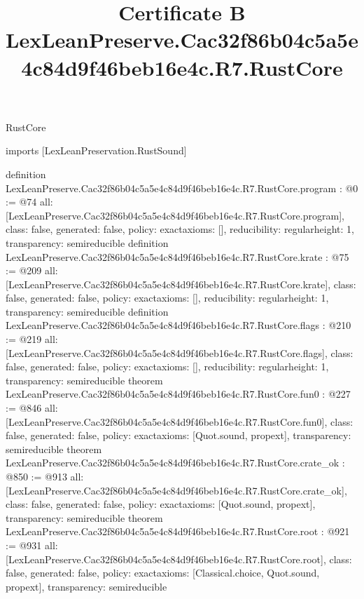 \begin{lexlean}{RustCore}
\title{Certificate B LexLeanPreserve.Cac32f86b04c5a5e4c84d9f46beb16e4c.R7.RustCore}
\begin{coremodule}
imports [LexLeanPreservation.RustSound]

definition LexLeanPreserve.Cac32f86b04c5a5e4c84d9f46beb16e4c.R7.RustCore.program : @0 := @74 {
  all: [LexLeanPreserve.Cac32f86b04c5a5e4c84d9f46beb16e4c.R7.RustCore.program],
  class: false,
  generated: false,
  policy: exact{axioms: []},
  reducibility: regular{height: 1},
  transparency: semireducible
}
definition LexLeanPreserve.Cac32f86b04c5a5e4c84d9f46beb16e4c.R7.RustCore.krate : @75 := @209 {
  all: [LexLeanPreserve.Cac32f86b04c5a5e4c84d9f46beb16e4c.R7.RustCore.krate],
  class: false,
  generated: false,
  policy: exact{axioms: []},
  reducibility: regular{height: 1},
  transparency: semireducible
}
definition LexLeanPreserve.Cac32f86b04c5a5e4c84d9f46beb16e4c.R7.RustCore.flags : @210 := @219 {
  all: [LexLeanPreserve.Cac32f86b04c5a5e4c84d9f46beb16e4c.R7.RustCore.flags],
  class: false,
  generated: false,
  policy: exact{axioms: []},
  reducibility: regular{height: 1},
  transparency: semireducible
}
theorem LexLeanPreserve.Cac32f86b04c5a5e4c84d9f46beb16e4c.R7.RustCore.fun0 : @227 := @846 {
  all: [LexLeanPreserve.Cac32f86b04c5a5e4c84d9f46beb16e4c.R7.RustCore.fun0],
  class: false,
  generated: false,
  policy: exact{axioms: [Quot.sound, propext]},
  transparency: semireducible
}
theorem LexLeanPreserve.Cac32f86b04c5a5e4c84d9f46beb16e4c.R7.RustCore.crate_ok : @850 := @913 {
  all: [LexLeanPreserve.Cac32f86b04c5a5e4c84d9f46beb16e4c.R7.RustCore.crate_ok],
  class: false,
  generated: false,
  policy: exact{axioms: [Quot.sound, propext]},
  transparency: semireducible
}
theorem LexLeanPreserve.Cac32f86b04c5a5e4c84d9f46beb16e4c.R7.RustCore.root : @921 := @931 {
  all: [LexLeanPreserve.Cac32f86b04c5a5e4c84d9f46beb16e4c.R7.RustCore.root],
  class: false,
  generated: false,
  policy: exact{axioms: [Classical.choice, Quot.sound, propext]},
  transparency: semireducible
}


\end{coremodule}
\end{lexlean}
